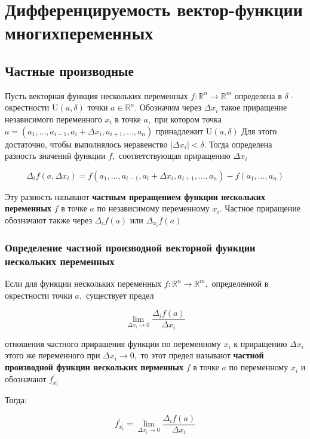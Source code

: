 \section{Дифференцируемость вектор-функции многихпеременных}
\subsection{Частные производные}

Пусть векторная функция нескольких переменных
\(f: \mathbb{R}^{n} \rightarrow \mathbb{R}^{m}\) определена в \(\delta\)
- окрестности \(\mathrm{U}(a, \delta)\) точки \(a \in \mathbb{R}^{n} .\)
Обозначим через \(\Delta x_{i}\) такое приращение независимого
переменного \(x_{i}\) в точке \(a,\) при котором точка
\(a=\left(a_{1}, \ldots, a_{i-1}, a_{i}+\Delta x_{i}, a_{i+1}, \ldots, a_{n}\right)\)
принадлежит \(\mathrm{U}(a, \delta)\) Для этого достаточно, чтобы
выполнялось неравенство \(\left|\Delta x_{i}\right|<\delta .\) Тогда
определена разность значений функции \(f,\) соответствующая приращению
\(\Delta x_{i}\)

\[\Delta_{i} f\left(a, \Delta x_{i}\right)=f\left(a_{1}, \ldots, a_{i-1}, a_{i}+\Delta x_{i}, a_{i+1}, \ldots, a_{n}\right)-f\left(a_{1}, \ldots, a_{n}\right)\]

Эту разность называют \textbf{частным преращением функции нескольких
переменных} \(f\) в точке \(a\) по независимому переменному \(x_{i} .\)
Частное приращение обозначают также через \(\Delta_{i} f(a)\) или
\(\Delta_{x_{i}} f(a)\)

\subsubsection{Определение частной производной векторной функции нескольких переменных}

Если для функции нескольких переменных
\(f: \mathbb{R}^{n} \rightarrow \mathbb{R}^{m},\) определенной в
окрестности точки \(a,\) существует предел

\[\lim _{\Delta x_{i} \rightarrow 0} \frac{\Delta_{i} f(a)}{\Delta x_{i}}\]

отношения частного прирашения функции по переменному \(x_{i}\) к
приращению \(\Delta x_{i}\) этого же переменного при
\(\Delta x_{i} \rightarrow 0,\) то этот предел называют \textbf{частной
производной функции нескольких перменных} \(f\) в точке \(a\) по
переменному \(x_{i}\) и обозначают \(f_{x_{i}^{\prime}}^{\prime}\)

Тогда:

\[ f_{x_{i}^{\prime}}^{\prime}=\lim _{\Delta x_{i} \rightarrow 0} \frac{\Delta_{i} f(a)}{\Delta x_{i}}\]

